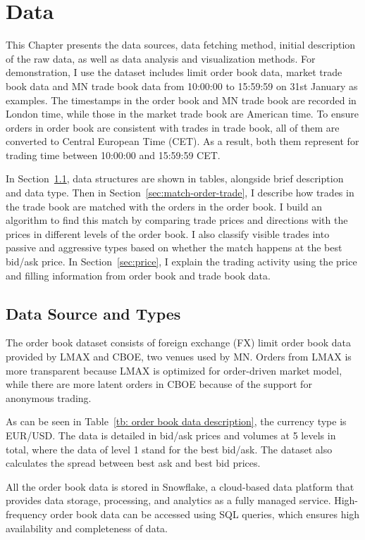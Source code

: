 \chapter{Data} \label{chapter:preliminary}
This Chapter presents the data sources, data fetching method, initial description of the raw data, as well as data analysis and visualization methods. For demonstration, I use the dataset includes limit order book data, market trade book data and MN trade book data from 10:00:00 to 15:59:59 on 31st January as examples. The timestamps in the order book and MN trade book are recorded in London time, while those in the market trade book are American time. To ensure orders in order book are consistent with trades in trade book, all of them are converted to Central European Time (CET). As a result, both them represent for trading time between 10:00:00 and 15:59:59 CET. 

In Section~\ref{sec:data-source}, data structures are shown in tables, alongside brief description and data type. Then in Section~\ref{sec:match-order-trade}, I describe how trades in the trade book are matched with the orders in the order book. I build an algorithm to find this match by comparing trade prices and directions with the prices in different levels of the order book. I also classify visible trades into passive and aggressive types based on whether the match happens at the best bid/ask price. 
In Section~\ref{sec:price}, I explain the trading activity using the price and filling information from order book and trade book data. 


\section{Data Source and Types} \label{sec:data-source}
The order book dataset consists of foreign exchange (FX) limit order book data provided by LMAX and CBOE, two venues used by MN. Orders from LMAX is more transparent because LMAX is optimized for order-driven market model, while there are more latent orders in CBOE because of the support for anonymous trading. 

As can be seen in Table~\ref{tb: order book data description}, the currency type is EUR/USD. The data is detailed in bid/ask prices and volumes at 5 levels in total, where the data of level 1 stand for the best bid/ask. The dataset also calculates the spread between best ask and best bid prices.

All the order book data is stored in Snowflake, a cloud-based data platform that provides data storage, processing, and analytics as a fully managed service. High-frequency order book data can be accessed using SQL queries, which ensures high availability and completeness of data.


